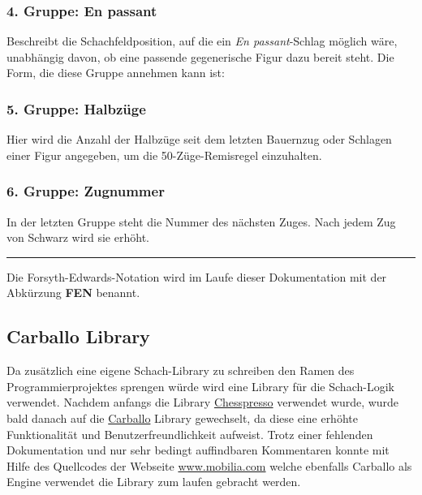 \subsubsection{4. Gruppe: En passant}

\code{-}

Beschreibt die Schachfeldposition, auf die ein \emph{En passant}-Schlag möglich
wäre, unabhängig davon, ob eine passende gegenerische Figur dazu bereit steht.
Die Form, die diese Gruppe annehmen kann ist:\\ 

\subsubsection{5. Gruppe: Halbzüge}


Hier wird die Anzahl der Halbzüge seit dem letzten Bauernzug oder Schlagen einer
Figur angegeben, um die 50-Züge-Remisregel einzuhalten.

\subsubsection{6. Gruppe: Zugnummer}


In der letzten Gruppe steht die Nummer des nächsten Zuges. Nach jedem Zug von
Schwarz wird sie erhöht.

\rule{\textwidth}{0.5pt}

Die Forsyth-Edwards-Notation wird im Laufe dieser Dokumentation mit der
Abkürzung \textbf{FEN} benannt.

\subsection{Carballo Library}
\subsectionauthor{\oliver}

Da zusätzlich eine eigene Schach-Library zu schreiben den Ramen des 
Programmierprojektes sprengen würde wird eine Library für die Schach-Logik 
verwendet. Nachdem anfangs die Library 
\href{http://www.chesspresso.org/}{Chesspresso} verwendet wurde, wurde bald 
danach auf die \href{https://github.com/albertoruibal/carballo}{Carballo} 
Library gewechselt, da diese eine erhöhte Funktionalität und 
Benutzerfreundlichkeit aufweist. Trotz einer fehlenden Dokumentation und nur 
sehr bedingt auffindbaren Kommentaren konnte mit Hilfe des Quellcodes der 
Webseite \href{https://www.mobialia.com/webchessgwt/}{www.mobilia.com} welche 
ebenfalls Carballo als Engine verwendet die Library zum laufen gebracht werden.

